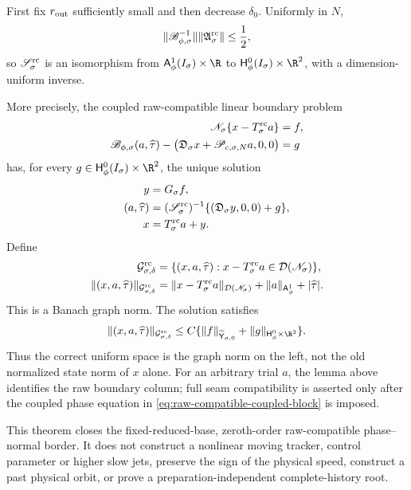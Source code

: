\begin{theorem}
First fix \(r_{\rm out}\) sufficiently small and then decrease
\(\delta_0\).  Uniformly in \(N\),
\begin{equation}
 \|\mathscr B_{\phi,\sigma}^{-1}\|
       \|\mathfrak A_\sigma^{\rm rc}\|\le\frac12,             \label{eq:raw-schur-smallness}
\end{equation}
so \(\mathscr S_\sigma^{\rm rc}\) is an isomorphism from
\(\mathsf A_\phi^1(I_\sigma)\times\R\) to
\(\mathsf H_\phi^0(I_\sigma)\times\R^2\), with a
dimension-uniform inverse.

More precisely, the coupled raw-compatible linear boundary problem
\begin{align}
 \mathscr N_\sigma\{x-T_\sigma^{\rm rc}a\}&=f,\notag\\
 \mathscr B_{\phi,\sigma}(a,\widehat\tau)
  -\bigl(\mathfrak D_\sigma x
       +\mathscr P_{c,\sigma,N}a,0,0\bigr)&=g             \label{eq:raw-compatible-coupled-block}
\end{align}
has, for every
\(g\in\mathsf H_\phi^0(I_\sigma)\times\R^2\), the unique solution
\begin{align}
 y&=G_\sigma f,\notag\\
 (a,\widehat\tau)
  &=(\mathscr S_\sigma^{\rm rc})^{-1}
       \{(\mathfrak D_\sigma y,0,0)+g\},\notag\\
x&=T_\sigma^{\rm rc}a+y.                       \label{eq:raw-compatible-schur-inverse}
\end{align}
Define
\begin{align}
 \mathcal G_{\sigma,\delta}^{\rm rc}
 &=\{(x,a,\widehat\tau):
       x-T_\sigma^{\rm rc}a\in\mathcal D(\mathscr N_\sigma)\},\notag\\
 \|(x,a,\widehat\tau)\|_{\mathcal G_{\sigma,\delta}^{\rm rc}}
 &=\|x-T_\sigma^{\rm rc}a\|_{\mathcal D(\mathscr N_\sigma)}
       +\|a\|_{\mathsf A_\phi^1}+|\widehat\tau|.    \label{eq:raw-compatible-full-graph-norm}
\end{align}
This is a Banach graph norm.  The solution satisfies
\begin{equation}
 \|(x,a,\widehat\tau)\|_{\mathcal G_{\sigma,\delta}^{\rm rc}}
 \le C\{\|f\|_{\widetilde{\mathsf Y}_{\sigma,0}}
                 +\|g\|_{\mathsf H_\phi^0\times\R^2}\}.      \label{eq:raw-compatible-schur-bound}
\end{equation}
Thus the correct uniform space is the graph norm on the left, not the old
normalized state norm of \(x\) alone.  For an arbitrary trial \(a\), the
lemma above identifies the raw boundary column; full seam compatibility is
asserted only after the coupled phase equation in
\cref{eq:raw-compatible-coupled-block} is imposed.

This theorem closes the fixed-reduced-base, zeroth-order raw-compatible
phase--normal border.  It does not construct a nonlinear moving tracker,
control parameter or higher slow jets, preserve the sign of the physical
speed, construct a past physical orbit, or prove a preparation-independent
complete-history root.
\end{theorem}

